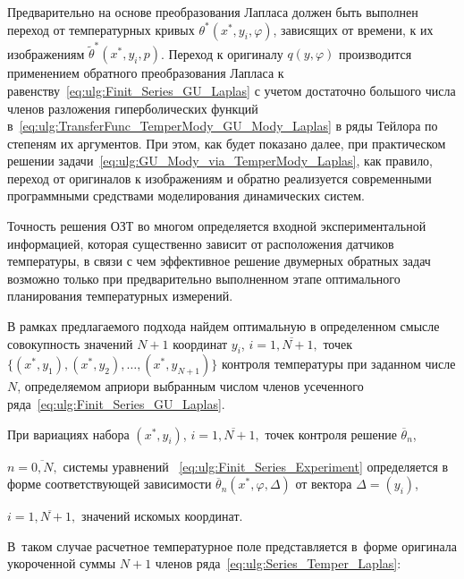 Предварительно на основе преобразования Лапласа должен быть выполнен переход от температурных кривых  $  {\theta ^*}(x^*,y_i,\varphi )  $, зависящих от времени, к их изображениям  $ \widetilde \theta ^*(x^*,y_i,p) $. Переход к оригиналу $ q(y,\varphi )  $  производится применением обратного преобразования Лапласа к равенству~\eqref{eq:ulg:Finit_Series_GU_Laplas} с учетом достаточно большого числа членов разложения гиперболических функций в~\eqref{eq:ulg:TransferFunc_TemperMody_GU_Mody_Laplas} в ряды Тейлора по степеням их аргументов. При этом, как будет показано далее, при практическом решении задачи~\eqref{eq:ulg:GU_Mody_via_TemperMody_Laplas}, как правило, переход от оригиналов к изображениям и обратно  реализуется современными программными средствами моделирования динамических систем.





\smallskip




Точность решения ОЗТ во многом определяется входной экспериментальной информацией, которая существенно зависит от расположения датчиков температуры, в связи с чем  эффективное решение двумерных обратных задач возможно только при предварительно выполненном этапе оптимального планирования температурных измерений. 

В рамках предлагаемого подхода найдем оптимальную в определенном смысле  совокупность значений $ N+1 $   координат $ y_i$, $i = \overline {1,N+1}, $  точек $\{ (x^*,y_1),(x^*,y_2), \ldots, (x^*,y_{N + 1}) \}$ контроля температуры  при заданном числе $ N  $, определяемом априори выбранным числом членов усеченного ряда~\eqref{eq:ulg:Finit_Series_GU_Laplas}.



При вариациях набора  $ (x^*,y_i)$, $i = \overline {1,N + 1}, $ точек контроля решение ${\overline \theta  _n}$, 

$n = \overline {0,N}, $  системы уравнений ~\eqref{eq:ulg:Finit_Series_Experiment} определяется в форме соответствующей зависимости $ {\overline \theta  _n}(x^*,\varphi ,\Delta ) $  от вектора  $\Delta  = ( y_i )$, 

$i = \overline {1,N + 1}, $ значений искомых координат. 

В~таком случае расчетное температурное поле представляется в~форме оригинала укороченной суммы $ N + 1 $ членов ряда~\eqref{eq:ulg:Series_Temper_Laplas}:

